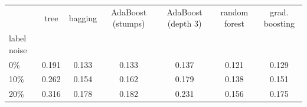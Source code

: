 \begin{tabular}{lcccccc}
\toprule
 & tree & bagging & AdaBoost (stumps) & AdaBoost (depth 3) & random forest & grad. boosting \\
label noise &  &  &  &  &  &  \\
\midrule
0\% & 0.191 & 0.133 & 0.133 & 0.137 & 0.121 & 0.129 \\
10\% & 0.262 & 0.154 & 0.162 & 0.179 & 0.138 & 0.151 \\
20\% & 0.316 & 0.178 & 0.182 & 0.231 & 0.156 & 0.175 \\
\bottomrule
\end{tabular}
